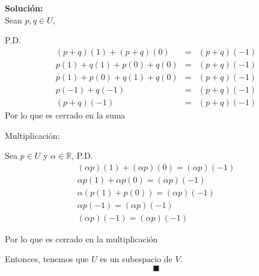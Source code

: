 \documentclass[12pt]{article}
\newenvironment{solucion}
{\begin{mdframed}[backgroundcolor=black!10]
		{\bf Solución:}\\
	}
	{
	\end{mdframed}
}
\newenvironment{preguntas}
{\begin{enumerate}\itemsep12pt
	}
	{
	\end{enumerate}
}
\newcommand{\R}{\mathbb{R}}
\begin{document}
\begin{preguntas}
\begin{solucion}
		Sean $p, q \in U$,
		
		P.D.
		$$ \begin{array}{rcl}
		(p+q)(1) + (p+q)(0) &= &(p+q)(-1)\\
		p(1) + q(1)+ p(0)+q(0) &= &(p+q)(-1)\\
		p(1) + p(0)+ q(1) + q(0) &= &(p+q)(-1)\\
		p(-1)+ q(-1) &= &(p+q)(-1)\\
		(p+q)(-1) &= &(p+q)(-1)
		\end{array}$$
		Por lo que es cerrado en la suma
		
		Multiplicación:
		
		Sea $p \in U$ y $\alpha \in \R$,
		P.D.
		$$ \begin{array}{rcl}
		(\alpha p)(1) + (\alpha p)(0) = (\alpha p)(-1) \\
		\alpha p(1) + \alpha p(0) = (\alpha p)(-1) \\
		\alpha ( p(1) +  p(0)) = (\alpha p)(-1) \\
		\alpha p(-1) = (\alpha p)(-1)\\
		(\alpha  p)(-1) = (\alpha p)(-1)
		\end{array}$$
		 
		Por lo que es cerrado en la multiplicación
		
		Entonces, tenemos que $U$ es un subespacio de $V$.
		$$\blacksquare$$
\end{solucion}
\end{preguntas}
\end{document}
